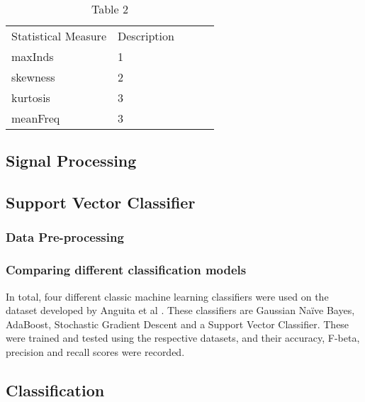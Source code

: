     \begin{table}[]
    \begin{tabular}{|l|l|lll}
    \cline{1-2}
    Statistical Measure & Description &  &  &  \\ \cline{1-2}
    maxInds             & 1           &  &  &  \\ \cline{1-2}
    skewness            & 2           &  &  &  \\ \cline{1-2}
    kurtosis               & 3           &  &  &  \\ \cline{1-2}
    meanFreq            & 3           &  &  &  \\ \cline{1-2}
    \end{tabular}
    \caption{Table 2}
    \label{tab:table-2}
    \end{table}


\subsection{Signal Processing}

\subsection{Support Vector Classifier}
    \subsubsection{Data Pre-processing}
        

    \subsubsection{Comparing different classification models}
        In total, four different classic machine learning classifiers were used on the dataset developed by Anguita et al \cite{Anguita2012}. These classifiers are Gaussian Naïve Bayes,
        AdaBoost, Stochastic Gradient Descent and a Support Vector Classifier. These were trained and tested using the respective datasets, and their accuracy,
        F-beta, precision and recall scores were recorded.

    \subsection{Classification}